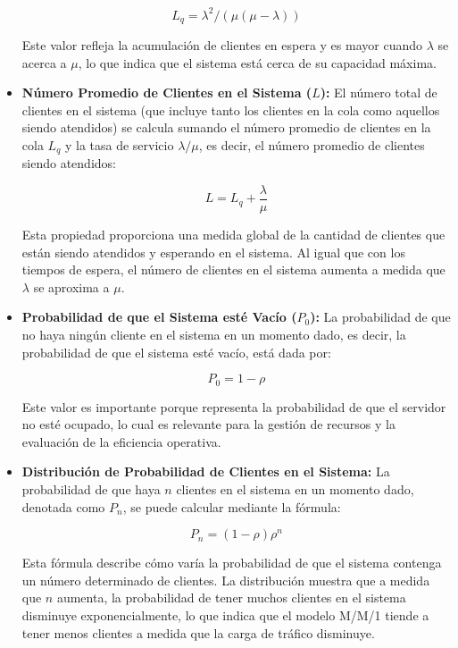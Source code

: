 \documentclass{article}
\begin{document}
\begin{itemize}
    \[
    L_q = \lambda^2 / (\mu (\mu - \lambda))
    \]

    Este valor refleja la acumulación de clientes en espera y es mayor cuando \( \lambda \) se acerca a \( \mu \), lo que indica que el sistema está cerca de su capacidad máxima.

    \item \textbf{Número Promedio de Clientes en el Sistema (\( L \)):} 
    El número total de clientes en el sistema (que incluye tanto los clientes en la cola como aquellos siendo atendidos) se calcula sumando el número promedio de clientes en la cola \( L_q \) y la tasa de servicio \( \lambda / \mu \), es decir, el número promedio de clientes siendo atendidos:

    \[
    L = L_q + \frac{\lambda}{\mu}
    \]

    Esta propiedad proporciona una medida global de la cantidad de clientes que están siendo atendidos y esperando en el sistema. Al igual que con los tiempos de espera, el número de clientes en el sistema aumenta a medida que \( \lambda \) se aproxima a \( \mu \).

    \item \textbf{Probabilidad de que el Sistema esté Vacío (\( P_0 \)):} 
    La probabilidad de que no haya ningún cliente en el sistema en un momento dado, es decir, la probabilidad de que el sistema esté vacío, está dada por:

    \[
    P_0 = 1 - \rho
    \]

    Este valor es importante porque representa la probabilidad de que el servidor no esté ocupado, lo cual es relevante para la gestión de recursos y la evaluación de la eficiencia operativa.

    \item \textbf{Distribución de Probabilidad de Clientes en el Sistema:}
    La probabilidad de que haya \( n \) clientes en el sistema en un momento dado, denotada como \( P_n \), se puede calcular mediante la fórmula:

    \[
    P_n = (1 - \rho) \rho^n
    \]

    Esta fórmula describe cómo varía la probabilidad de que el sistema contenga un número determinado de clientes. La distribución muestra que a medida que \( n \) aumenta, la probabilidad de tener muchos clientes en el sistema disminuye exponencialmente, lo que indica que el modelo M/M/1 tiende a tener menos clientes a medida que la carga de tráfico disminuye.

\end{itemize}
\end{document}
